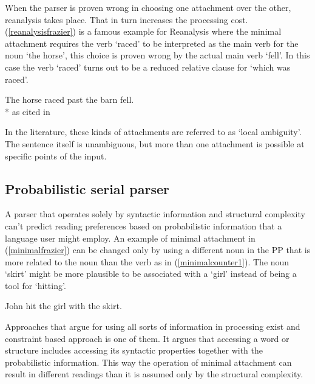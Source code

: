 When the parser is proven wrong in choosing one attachment over the other, reanalysis takes place. That in turn increases the processing cost. (\ref{reanalysisfrazier}) is a famous example for Reanalysis where the minimal attachment requires the verb `raced' to be interpreted as the main verb for the noun `the horse', this choice is proven wrong by the actual main verb `fell'. In this case the verb `raced' turns out to be a reduced relative clause for `which was raced'.

\begin{exe}
\ex \label{reanalysisfrazier}
The horse raced past the barn fell. \\*
\hfill as cited in \cite{frazier1987sentence}
\end{exe}

In the literature, these kinds of attachments are referred to as `local ambiguity'. The sentence itself is unambiguous, but more than one attachment is possible at specific points of the input.

\subsection{Probabilistic serial parser}

A parser that operates solely by syntactic information and structural complexity can't predict reading preferences based on probabilistic information that a language user might employ. An example of minimal attachment in (\ref{minimalfrazier}) can be changed only by using a different noun in the PP that is more related to the noun than the verb as in (\ref{minimalcounter1}). The noun `skirt' might be more plausible to be associated with a `girl' instead of being a tool for `hitting'.

\begin{exe}
    \ex \label{minimalcounter1}
    John hit the girl with the skirt.
\end{exe}

Approaches that argue for using all sorts of information in processing exist and constraint based approach \citep{MacDonald1994} is one of them. It argues that accessing a word or structure includes accessing its syntactic properties together with the probabilistic information. This way the operation of minimal attachment can result in different readings than it is assumed only by the structural complexity.

